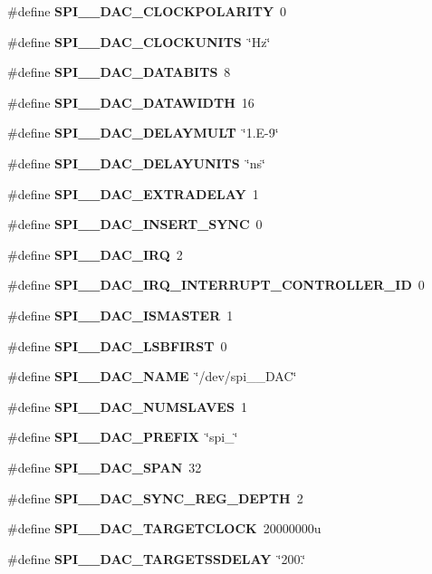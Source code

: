 \begin{DoxyCompactItemize}
\#define {\bf S\+P\+I\+\_\+\_\+\+D\+A\+C\+\_\+\+C\+L\+O\+C\+K\+P\+O\+L\+A\+R\+I\+TY}~0
\item 
\#define {\bf S\+P\+I\+\_\+\_\+\+D\+A\+C\+\_\+\+C\+L\+O\+C\+K\+U\+N\+I\+TS}~\char`\"{}Hz\char`\"{}
\item 
\#define {\bf S\+P\+I\+\_\+\_\+\+D\+A\+C\+\_\+\+D\+A\+T\+A\+B\+I\+TS}~8
\item 
\#define {\bf S\+P\+I\+\_\+\_\+\+D\+A\+C\+\_\+\+D\+A\+T\+A\+W\+I\+D\+TH}~16
\item 
\#define {\bf S\+P\+I\+\_\+\_\+\+D\+A\+C\+\_\+\+D\+E\+L\+A\+Y\+M\+U\+LT}~\char`\"{}1.\+E-\/9\char`\"{}
\item 
\#define {\bf S\+P\+I\+\_\+\_\+\+D\+A\+C\+\_\+\+D\+E\+L\+A\+Y\+U\+N\+I\+TS}~\char`\"{}ns\char`\"{}
\item 
\#define {\bf S\+P\+I\+\_\+\_\+\+D\+A\+C\+\_\+\+E\+X\+T\+R\+A\+D\+E\+L\+AY}~1
\item 
\#define {\bf S\+P\+I\+\_\+\_\+\+D\+A\+C\+\_\+\+I\+N\+S\+E\+R\+T\+\_\+\+S\+Y\+NC}~0
\item 
\#define {\bf S\+P\+I\+\_\+\_\+\+D\+A\+C\+\_\+\+I\+RQ}~2
\item 
\#define {\bf S\+P\+I\+\_\+\_\+\+D\+A\+C\+\_\+\+I\+R\+Q\+\_\+\+I\+N\+T\+E\+R\+R\+U\+P\+T\+\_\+\+C\+O\+N\+T\+R\+O\+L\+L\+E\+R\+\_\+\+ID}~0
\item 
\#define {\bf S\+P\+I\+\_\+\_\+\+D\+A\+C\+\_\+\+I\+S\+M\+A\+S\+T\+ER}~1
\item 
\#define {\bf S\+P\+I\+\_\+\_\+\+D\+A\+C\+\_\+\+L\+S\+B\+F\+I\+R\+ST}~0
\item 
\#define {\bf S\+P\+I\+\_\+\_\+\+D\+A\+C\+\_\+\+N\+A\+ME}~\char`\"{}/dev/spi\+\_\+\_\+\+D\+AC\char`\"{}
\item 
\#define {\bf S\+P\+I\+\_\+\_\+\+D\+A\+C\+\_\+\+N\+U\+M\+S\+L\+A\+V\+ES}~1
\item 
\#define {\bf S\+P\+I\+\_\+\_\+\+D\+A\+C\+\_\+\+P\+R\+E\+F\+IX}~\char`\"{}spi\+\_\+\char`\"{}
\item 
\#define {\bf S\+P\+I\+\_\+\_\+\+D\+A\+C\+\_\+\+S\+P\+AN}~32
\item 
\#define {\bf S\+P\+I\+\_\+\_\+\+D\+A\+C\+\_\+\+S\+Y\+N\+C\+\_\+\+R\+E\+G\+\_\+\+D\+E\+P\+TH}~2
\item 
\#define {\bf S\+P\+I\+\_\+\_\+\+D\+A\+C\+\_\+\+T\+A\+R\+G\+E\+T\+C\+L\+O\+CK}~20000000u
\item 
\#define {\bf S\+P\+I\+\_\+\_\+\+D\+A\+C\+\_\+\+T\+A\+R\+G\+E\+T\+S\+S\+D\+E\+L\+AY}~\char`\"{}200.\char`\"{}
\item 

\end{DoxyCompactItemize}
